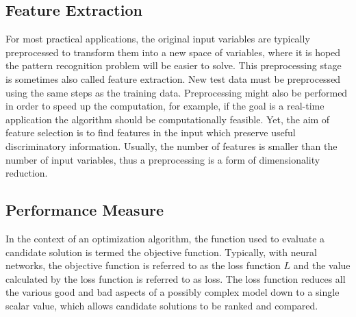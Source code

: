 \documentclass{scrartcl}
\begin{document}


\subsection{Feature Extraction}

For most practical applications, the original input variables are typically preprocessed to transform them into a new space of variables, where it is hoped the pattern recognition problem will be easier to solve. This preprocessing stage is sometimes also called feature extraction. New test data must be preprocessed using the same steps as the training data. Preprocessing might also be performed in order to speed up the computation, for example, if the goal is a real-time application the algorithm should be computationally feasible. Yet, the aim of feature selection is to find features in the input which preserve useful discriminatory information. Usually, the number of features is smaller than the number of input variables, thus a preprocessing is a form of dimensionality reduction. 




\subsection{Performance Measure}

In the context of an optimization algorithm, the function used to evaluate a candidate solution is termed the objective function. Typically, with neural networks, the objective function is referred to as the loss function $L$ and the value calculated by the loss function is referred to as loss. The loss function reduces all the various good and bad aspects of a possibly complex model down to a single scalar value, which allows candidate solutions to be ranked and compared.
\end{document}
